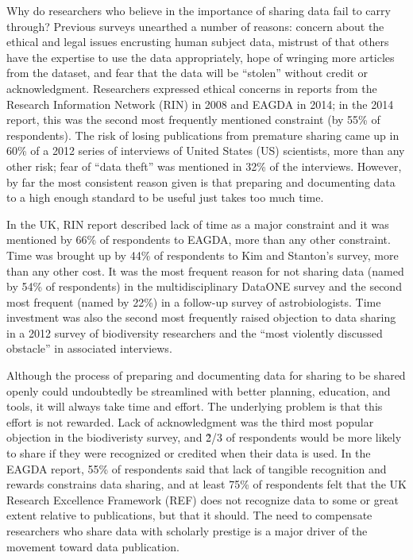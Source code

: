 \documentclass[10pt]{article}
\begin{document}
Why do researchers who believe in the importance of sharing data fail to carry through?
Previous surveys unearthed a number of reasons: concern about the ethical and legal issues encrusting human subject data, mistrust of that others have the expertise to use the data appropriately, hope of wringing more articles from the dataset, and fear that the data will be ``stolen'' without credit or acknowledgment.
Researchers expressed ethical concerns in reports from the Research Information Network (RIN) in 2008 and EAGDA in 2014; in the 2014 report, this was the second most frequently mentioned constraint (by 55\% of respondents)\cite{swan_share_2008, bobrow_establishing_2014}.
The risk of losing publications from premature sharing came up in 60\% of a 2012 series of interviews of United States (US) scientists, more than any other risk; fear of ``data theft'' was mentioned in 32\% of the interviews\cite{kim_institutional_2012}.
However, by far the most consistent reason given is that preparing and documenting data to a high enough standard to be useful just takes too much time.

In the UK, RIN report described lack of time as a major constraint\cite{swan_share_2008} and it was mentioned by 66\% of respondents to EAGDA, more than any other constraint\cite{bobrow_establishing_2014}.
Time was brought up by 44\% of respondents to Kim and Stanton's survey\cite{kim_institutional_2012}, more than any other cost.
It was the most frequent reason for not sharing data (named by 54\% of respondents) in the multidisciplinary DataONE survey \cite{tenopir_data_2011} and the second most frequent (named by 22\%) in a follow-up survey of astrobiologists\cite{aydinoglu_data_2014}.
Time investment was also the second most frequently raised objection to data sharing in a 2012 survey of biodiversity researchers and the ``most violently discussed obstacle'' in associated interviews\cite{enke_users_2012}.

Although the process of preparing and documenting data for sharing to be shared openly could undoubtedly be streamlined with better planning, education, and tools, it will always take time and effort.
The underlying problem is that this effort is not rewarded.
Lack of acknowledgment was the third most popular objection in the biodiveristy survey, and \~2/3 of respondents would be more likely to share if they were recognized or credited when their data is used.
In the EAGDA report, 55\% of respondents said that lack of tangible recognition and rewards constrains data sharing, and at least 75\% of respondents felt that the UK Research Excellence Framework (REF) does not recognize data to some or great extent relative to publications, but that it should.
The need to compensate researchers who share data with scholarly prestige is a major driver of the movement toward data publication.
 
\end{document}
